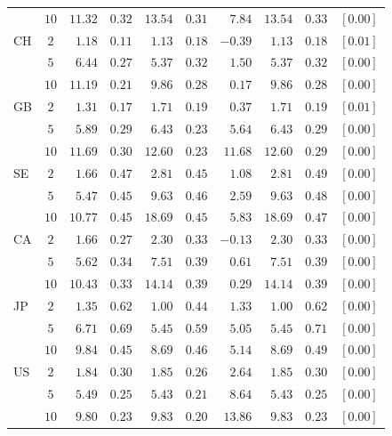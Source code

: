\begin{tabular}{l c rc rc rrcc}
     & $10$ & $11.32$ & $0.32$ & $13.54$ & $0.31$ & $7.84$  & $13.54$ & $0.33$ & $[0.00]$ \\
  \addlinespace
  CH & $2$  & $1.18$  & $0.11$ & $1.13$  & $0.18$ & $-0.39$ & $1.13$  & $0.18$ & $[0.01]$ \\
     & $5$  & $6.44$  & $0.27$ & $5.37$  & $0.32$ & $1.50$  & $5.37$  & $0.32$ & $[0.00]$ \\
     & $10$ & $11.19$ & $0.21$ & $9.86$  & $0.28$ & $0.17$  & $9.86$  & $0.28$ & $[0.00]$ \\
  \addlinespace
  GB & $2$  & $1.31$  & $0.17$ & $1.71$  & $0.19$ & $0.37$  & $1.71$  & $0.19$ & $[0.01]$ \\
     & $5$  & $5.89$  & $0.29$ & $6.43$  & $0.23$ & $5.64$  & $6.43$  & $0.29$ & $[0.00]$ \\
     & $10$ & $11.69$ & $0.30$ & $12.60$ & $0.23$ & $11.68$ & $12.60$ & $0.29$ & $[0.00]$ \\
  \addlinespace
  SE & $2$  & $1.66$  & $0.47$ & $2.81$  & $0.45$ & $1.08$  & $2.81$  & $0.49$ & $[0.00]$ \\
     & $5$  & $5.47$  & $0.45$ & $9.63$  & $0.46$ & $2.59$  & $9.63$  & $0.48$ & $[0.00]$ \\
     & $10$ & $10.77$ & $0.45$ & $18.69$ & $0.45$ & $5.83$  & $18.69$ & $0.47$ & $[0.00]$ \\
  \addlinespace
  CA & $2$  & $1.66$  & $0.27$ & $2.30$  & $0.33$ & $-0.13$ & $2.30$  & $0.33$ & $[0.00]$ \\
     & $5$  & $5.62$  & $0.34$ & $7.51$  & $0.39$ & $0.61$  & $7.51$  & $0.39$ & $[0.00]$ \\
     & $10$ & $10.43$ & $0.33$ & $14.14$ & $0.39$ & $0.29$  & $14.14$ & $0.39$ & $[0.00]$ \\
  \addlinespace
  JP & $2$  & $1.35$  & $0.62$ & $1.00$  & $0.44$ & $1.33$  & $1.00$  & $0.62$ & $[0.00]$ \\
     & $5$  & $6.71$  & $0.69$ & $5.45$  & $0.59$ & $5.05$  & $5.45$  & $0.71$ & $[0.00]$ \\
     & $10$ & $9.84$  & $0.45$ & $8.69$  & $0.46$ & $5.14$  & $8.69$  & $0.49$ & $[0.00]$ \\
  \addlinespace
  US & $2$  & $1.84$  & $0.30$ & $1.85$  & $0.26$ & $2.64$  & $1.85$  & $0.30$ & $[0.00]$ \\
     & $5$  & $5.49$  & $0.25$ & $5.43$  & $0.21$ & $8.64$  & $5.43$  & $0.25$ & $[0.00]$ \\
     & $10$ & $9.80$  & $0.23$ & $9.83$  & $0.20$ & $13.86$ & $9.83$  & $0.23$ & $[0.00]$ \\
  \bottomrule
\end{tabular}
